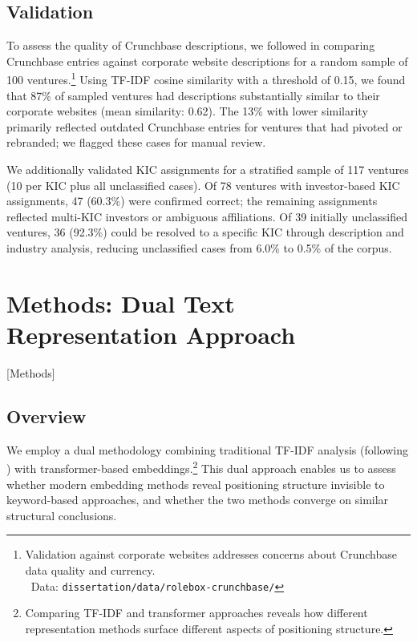 \documentclass[../main.tex]{subfiles}
\begin{document}
\subsection{Validation}

To assess the quality of Crunchbase descriptions, we followed \cite{basole2019visual} in comparing Crunchbase entries against corporate website descriptions for a random sample of 100 ventures.\footnote{Validation against corporate websites addresses concerns about Crunchbase data quality and currency.\\\iconinvest\ Data: \texttt{dissertation/data/rolebox-crunchbase/}} Using TF-IDF cosine similarity with a threshold of 0.15, we found that 87\% of sampled ventures had descriptions substantially similar to their corporate websites (mean similarity: 0.62). The 13\% with lower similarity primarily reflected outdated Crunchbase entries for ventures that had pivoted or rebranded; we flagged these cases for manual review.

We additionally validated KIC assignments for a stratified sample of
117 ventures (10 per KIC plus all unclassified cases).
Of 78 ventures with investor-based KIC assignments,
47 (60.3\%) were confirmed correct; the remaining
assignments reflected multi-KIC investors or ambiguous affiliations.
Of 39 initially unclassified ventures, 36 (92.3\%) could be resolved
to a specific KIC through description and industry analysis,
reducing unclassified cases from 6.0\% to 0.5\% of the corpus.

\section{Methods: Dual Text Representation Approach}[Methods]

\subsection{Overview}

We employ a dual methodology combining traditional TF-IDF analysis (following \cite{basole2019visual}) with transformer-based embeddings.\footnote{Comparing TF-IDF and transformer approaches reveals how different representation methods surface different aspects of positioning structure.} This dual approach enables us to assess whether modern embedding methods reveal positioning structure invisible to keyword-based approaches, and whether the two methods converge on similar structural conclusions.
\end{document}

